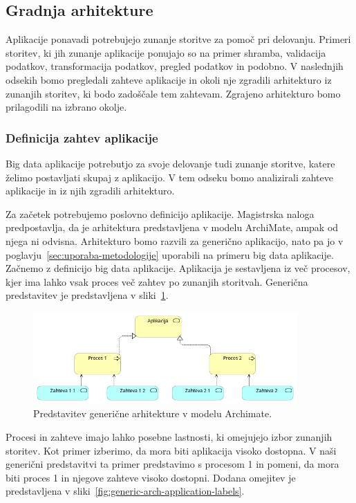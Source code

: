 \subsection{Gradnja arhitekture}

Aplikacije ponavadi potrebujejo zunanje storitve za
pomoč pri delovanju.
Primeri storitev, ki jih zunanje aplikacije ponujajo so na primer
shramba, validacija podatkov, transformacija podatkov, pregled podatkov in podobno.
V naslednjih odsekih bomo pregledali zahteve aplikacije
in okoli nje zgradili arhitekturo iz zunanjih storitev, ki bodo zadoščale tem zahtevam.
Zgrajeno arhitekturo bomo prilagodili na izbrano okolje.

\subsubsection{Definicija zahtev aplikacije}

Big data aplikacije potrebutjo za svoje delovanje
tudi zunanje storitve, katere želimo postavljati skupaj z
aplikacijo.
V tem odseku bomo analizirali zahteve aplikacije in
iz njih zgradili arhitekturo.

Za začetek potrebujemo poslovno definicijo aplikacije.
Magistrska naloga predpostavlja, da je arhitektura
predstavljena v modelu ArchiMate, ampak od njega ni odvisna.
Arhitekturo bomo razvili za generično aplikacijo,
nato pa jo v poglavju~\ref{sec:uporaba-metodologije} uporabili
na primeru big data aplikacije.
Začnemo z definicijo big data aplikacije.
Aplikacija je sestavljena iz več procesov, kjer ima lahko
vsak proces več zahtev po zunanjih storitvah.
Generična predstavitev je predstavljena v sliki~\ref{fig:generic-arch-application}.

\begin{figure}[H]
    \centering
    \includegraphics[width=0.9\textwidth]{img/gradnja/generic-arch-application.png}
    \caption{Predstavitev generične arhitekture v modelu Archimate.}
    \label{fig:generic-arch-application}
\end{figure}

Procesi in zahteve imajo lahko posebne lastnosti,
ki omejujejo izbor zunanjih storitev.
Kot primer izberimo, da mora biti aplikacija visoko dostopna.
V naši generični predstavitvi ta primer predstavimo s procesom 1 in pomeni,
da mora biti proces 1 in njegove zahteve visoko dostopni.
Dodana omejitev je predstavljena v sliki~\ref{fig:generic-arch-application-labels}.


